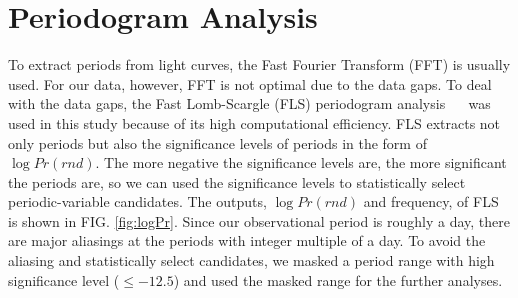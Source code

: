 \documentclass[aps,prb,twocolumn,superscriptaddress]{revtex4-1}
\begin{document}
\section{Periodogram Analysis}\label{sec:PA}

To extract periods from light curves, the Fast Fourier Transform (FFT) is usually used. For our data, however, FFT is not optimal due to the data gaps. To deal with the data gaps, the Fast Lomb-Scargle (FLS) periodogram analysis~\citep{Numerical} ~\citep{Gats} was used in this study because of its high computational efficiency. FLS extracts not only periods but also the significance levels of periods in the form of $\log{Pr(rnd)}$. The more negative the significance levels are, the more significant the periods are, so we can used the significance levels to statistically select periodic-variable candidates. The outputs, $\log{Pr(rnd)}$ and frequency, of FLS is shown in FIG. \ref{fig:logPr}. Since our observational period is roughly a day, there are major aliasings at the periods with integer multiple of a day. To avoid the aliasing and statistically select candidates, we masked a period range with high significance level ($\leq -12.5$) and used the masked range for the further analyses.
\end{document}
